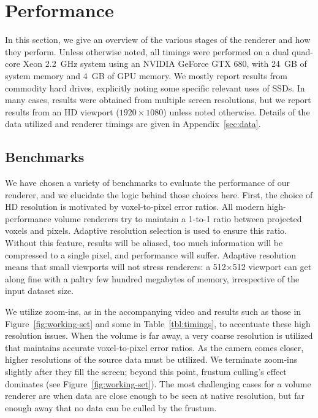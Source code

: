 \section{Performance}
\label{sec:performance}

In this section, we give an overview of the various stages of the
renderer and how they perform.  Unless otherwise noted, all timings
were performed on a dual quad-core Xeon 2.2~GHz system using an NVIDIA
GeForce GTX 680, with 24~GB of system memory and 4~GB of GPU memory.
We mostly report results from commodity hard drives, explicitly noting
some specific relevant uses of SSDs.  In many cases, results were
obtained from multiple screen resolutions, but we report results from
an HD viewport ($1920\times1080$) unless noted otherwise.  Details of
the data utilized and renderer timings are given in
Appendix~\ref{sec:data}.

\subsection{Benchmarks}

We have chosen a variety of benchmarks to evaluate the performance of
our renderer, and we elucidate the logic behind those choices here.
First, the choice of HD resolution is motivated by voxel-to-pixel error
ratios.  All modern high-performance volume renderers try to maintain a
1-to-1 ratio between projected voxels and pixels.  Adaptive resolution
selection is used to ensure this ratio.  Without this feature, results
will be aliased, too much information will be compressed to a single
pixel, and performance will suffer.  Adaptive resolution means that
small viewports will not stress renderers: a 512$\times$512 viewport
can get along fine with a paltry few hundred megabytes of memory,
irrespective of the input dataset size.

We utilize zoom-ins, as in the accompanying video and results such as
those in Figure~\ref{fig:working-set} and some in
Table~\ref{tbl:timings}, to accentuate these high resolution issues.
When the volume is far away, a very coarse resolution is utilized that
maintains accurate voxel-to-pixel error ratios.  As the camera comes
closer, higher resolutions of the source data must be utilized.  We
terminate zoom-ins slightly after they fill the screen; beyond this
point, frustum culling's effect dominates (see
Figure~\ref{fig:working-set}).  The most challenging cases for a
volume renderer are when data are close enough to be seen at native
resolution, but far enough away that no data can be culled by the
frustum.


